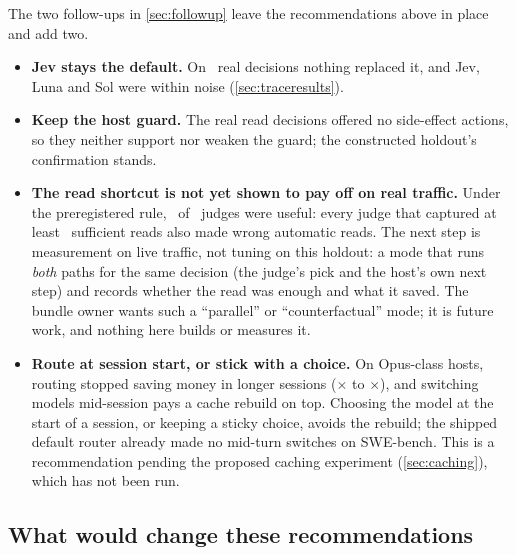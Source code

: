 The two follow-ups in \cref{sec:followup} leave the recommendations above in place and add two.
\begin{itemize}
  \item \textbf{Jev stays the default.} On \TrN\ real decisions nothing replaced it, and Jev, Luna and Sol
    were within noise (\cref{sec:traceresults}).
  \item \textbf{Keep the host guard.} The real read decisions offered no side-effect actions, so they
    neither support nor weaken the guard; the constructed holdout's confirmation stands.
  \item \textbf{The read shortcut is not yet shown to pay off on real traffic.} Under the preregistered
    rule, \TrNUseful\ of \NumBase\ judges were useful: every judge that captured at least
    \TrUsefulMinReads\ sufficient reads also made wrong automatic reads. The next step is measurement on
    live traffic, not tuning on this holdout: a mode that runs \emph{both} paths for the same decision
    (the judge's pick and the host's own next step) and records whether the read was enough and what it
    saved. The bundle owner wants such a ``parallel'' or ``counterfactual'' mode; it is future work, and
    nothing here builds or measures it.
  \item \textbf{Route at session start, or stick with a choice.} On Opus-class hosts, routing stopped
    saving money in longer sessions (\CaOpusRoutedOne$\times$ to \CaOpusRoutedFour$\times$), and switching
    models mid-session pays a cache rebuild on top. Choosing the model at the start of a session, or
    keeping a sticky choice, avoids the rebuild; the shipped default router already made no mid-turn
    switches on SWE-bench. This is a recommendation pending the proposed caching experiment
    (\cref{sec:caching}), which has not been run.
\end{itemize}

\subsection{What would change these recommendations}

